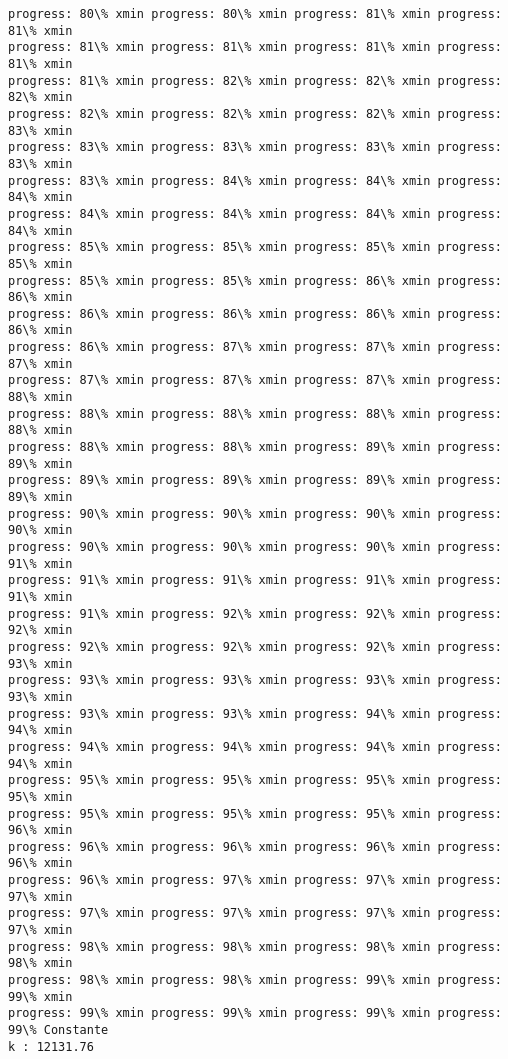 \documentclass[11pt]{article}
\begin{document}
\begin{Verbatim}[commandchars=\\\{\}]
progress: 80\% xmin progress: 80\% xmin progress: 81\% xmin progress: 81\% xmin
progress: 81\% xmin progress: 81\% xmin progress: 81\% xmin progress: 81\% xmin
progress: 81\% xmin progress: 82\% xmin progress: 82\% xmin progress: 82\% xmin
progress: 82\% xmin progress: 82\% xmin progress: 82\% xmin progress: 83\% xmin
progress: 83\% xmin progress: 83\% xmin progress: 83\% xmin progress: 83\% xmin
progress: 83\% xmin progress: 84\% xmin progress: 84\% xmin progress: 84\% xmin
progress: 84\% xmin progress: 84\% xmin progress: 84\% xmin progress: 84\% xmin
progress: 85\% xmin progress: 85\% xmin progress: 85\% xmin progress: 85\% xmin
progress: 85\% xmin progress: 85\% xmin progress: 86\% xmin progress: 86\% xmin
progress: 86\% xmin progress: 86\% xmin progress: 86\% xmin progress: 86\% xmin
progress: 86\% xmin progress: 87\% xmin progress: 87\% xmin progress: 87\% xmin
progress: 87\% xmin progress: 87\% xmin progress: 87\% xmin progress: 88\% xmin
progress: 88\% xmin progress: 88\% xmin progress: 88\% xmin progress: 88\% xmin
progress: 88\% xmin progress: 88\% xmin progress: 89\% xmin progress: 89\% xmin
progress: 89\% xmin progress: 89\% xmin progress: 89\% xmin progress: 89\% xmin
progress: 90\% xmin progress: 90\% xmin progress: 90\% xmin progress: 90\% xmin
progress: 90\% xmin progress: 90\% xmin progress: 90\% xmin progress: 91\% xmin
progress: 91\% xmin progress: 91\% xmin progress: 91\% xmin progress: 91\% xmin
progress: 91\% xmin progress: 92\% xmin progress: 92\% xmin progress: 92\% xmin
progress: 92\% xmin progress: 92\% xmin progress: 92\% xmin progress: 93\% xmin
progress: 93\% xmin progress: 93\% xmin progress: 93\% xmin progress: 93\% xmin
progress: 93\% xmin progress: 93\% xmin progress: 94\% xmin progress: 94\% xmin
progress: 94\% xmin progress: 94\% xmin progress: 94\% xmin progress: 94\% xmin
progress: 95\% xmin progress: 95\% xmin progress: 95\% xmin progress: 95\% xmin
progress: 95\% xmin progress: 95\% xmin progress: 95\% xmin progress: 96\% xmin
progress: 96\% xmin progress: 96\% xmin progress: 96\% xmin progress: 96\% xmin
progress: 96\% xmin progress: 97\% xmin progress: 97\% xmin progress: 97\% xmin
progress: 97\% xmin progress: 97\% xmin progress: 97\% xmin progress: 97\% xmin
progress: 98\% xmin progress: 98\% xmin progress: 98\% xmin progress: 98\% xmin
progress: 98\% xmin progress: 98\% xmin progress: 99\% xmin progress: 99\% xmin
progress: 99\% xmin progress: 99\% xmin progress: 99\% xmin progress: 99\% Constante
k : 12131.76
    \end{Verbatim}

    \begin{center}
    \end{center}
    { \hspace*{\fill} \\}
    
\end{document}
